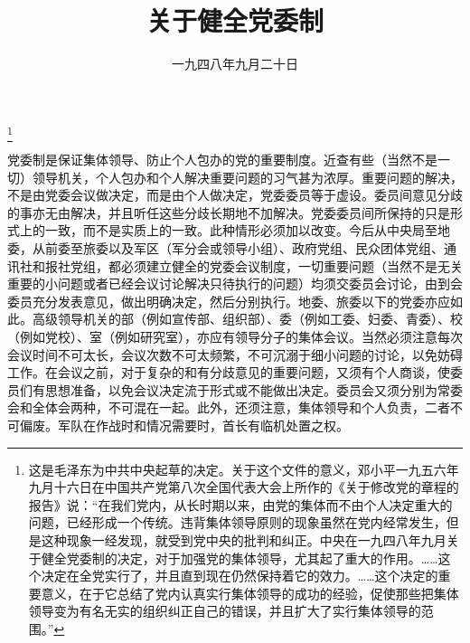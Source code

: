 
\title{关于健全党委制}
\date{一九四八年九月二十日}
\thanks{这是毛泽东为中共中央起草的决定。关于这个文件的意义，邓小平一九五六年九月十六日在中国共产党第八次全国代表大会上所作的《关于修改党的章程的报告》说：“在我们党内，从长时期以来，由党的集体而不由个人决定重大的问题，已经形成一个传统。违背集体领导原则的现象虽然在党内经常发生，但是这种现象一经发现，就受到党中央的批判和纠正。中央在一九四八年九月关于健全党委制的决定，对于加强党的集体领导，尤其起了重大的作用。……这个决定在全党实行了，并且直到现在仍然保持着它的效力。……这个决定的重要意义，在于它总结了党内认真实行集体领导的成功的经验，促使那些把集体领导变为有名无实的组织纠正自己的错误，并且扩大了实行集体领导的范围。”}
\maketitle


党委制是保证集体领导、防止个人包办的党的重要制度。近查有些（当然不是一切）领导机关，个人包办和个人解决重要问题的习气甚为浓厚。重要问题的解决，不是由党委会议做决定，而是由个人做决定，党委委员等于虚设。委员间意见分歧的事亦无由解决，并且听任这些分歧长期地不加解决。党委委员间所保持的只是形式上的一致，而不是实质上的一致。此种情形必须加以改变。今后从中央局至地委，从前委至旅委以及军区（军分会或领导小组）、政府党组、民众团体党组、通讯社和报社党组，都必须建立健全的党委会议制度，一切重要问题（当然不是无关重要的小问题或者已经会议讨论解决只待执行的问题）均须交委员会讨论，由到会委员充分发表意见，做出明确决定，然后分别执行。地委、旅委以下的党委亦应如此。高级领导机关的部（例如宣传部、组织部）、委（例如工委、妇委、青委）、校（例如党校）、室（例如研究室），亦应有领导分子的集体会议。当然必须注意每次会议时间不可太长，会议次数不可太频繁，不可沉溺于细小问题的讨论，以免妨碍工作。在会议之前，对于复杂的和有分歧意见的重要问题，又须有个人商谈，使委员们有思想准备，以免会议决定流于形式或不能做出决定。委员会又须分别为常委会和全体会两种，不可混在一起。此外，还须注意，集体领导和个人负责，二者不可偏废。军队在作战时和情况需要时，首长有临机处置之权。
